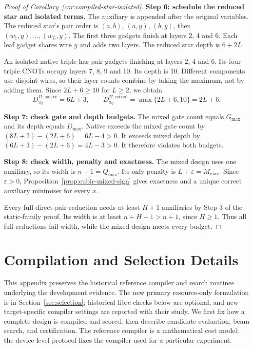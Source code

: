\documentclass[a4paper,onecolumn,11pt,unpublished]{quantumarticle}
\theoremstyle{remark}
\begin{document}
\begin{proof}[Proof of Corollary~\ref{cor:compiled-star-isolated}]
\textbf{Step 6: schedule the reduced star and isolated terms.}
The auxiliary is appended after the original variables.
The reduced star's pair order is $(a,b)$, $(a,y)$, $(b,y)$, then
$(w_1,y),\ldots,(w_L,y)$.
The first three gadgets finish at layers 2, 4 and 6.
Each leaf gadget shares wire $y$ and adds two layers.
The reduced star depth is $6+2L$.

An isolated native triple has pair gadgets finishing at layers 2, 4 and 6.
Its four triple CNOTs occupy layers 7, 8, 9 and 10.
Its depth is 10. Different components use disjoint wires, so their layer
counts combine by taking the maximum, not by adding them.
Since $2L+6\geq10$ for $L\geq2$, we obtain
\[
 D_{2q}^{\Pi,\mathrm{native}}=6L+3,
 \qquad D_{2q}^{\Pi,\mathrm{mixed}}=\max\{2L+6,10\}=2L+6.
\]

\textbf{Step 7: check gate and depth budgets.}
The mixed gate count equals $G_{\max}$ and its depth equals $D_{\max}$.
Native exceeds the mixed gate count by
$(8L+2)-(2L+6)=6L-4>0$.
It exceeds mixed depth by $(6L+3)-(2L+6)=4L-3>0$.
It therefore violates both budgets.

\textbf{Step 8: check width, penalty and exactness.}
The mixed design uses one auxiliary, so its width is $n+1=Q_{\max}$.
Its only penalty is $L+\varepsilon=M_{\max}$.
Since $\varepsilon>0$, Proposition~\ref{prop:cubic-mixed-sign} gives exactness
and a unique correct auxiliary minimiser for every $x$.

Every full direct-pair reduction needs at least $H+1$ auxiliaries by
Step 3 of the static-family proof.
Its width is at least $n+H+1>n+1$, since $H\geq1$.
Thus all full reductions fail width, while the mixed design meets every budget.
\end{proof}

\section{Compilation and Selection Details}
\label{app:certified-selection}

This appendix preserves the historical reference compiler and search routines
underlying the development evidence. The new primary resource-only formulation
is in Section~\ref{sec:selection}; historical fibre checks below are optional,
and new target-specific compiler settings are reported with their study.
We first fix how a complete design is compiled and scored, then describe
candidate evaluation, beam search, and certification.  The reference compiler
is a mathematical cost model; the device-level protocol fixes the compiler
used for a particular experiment.
\end{document}
